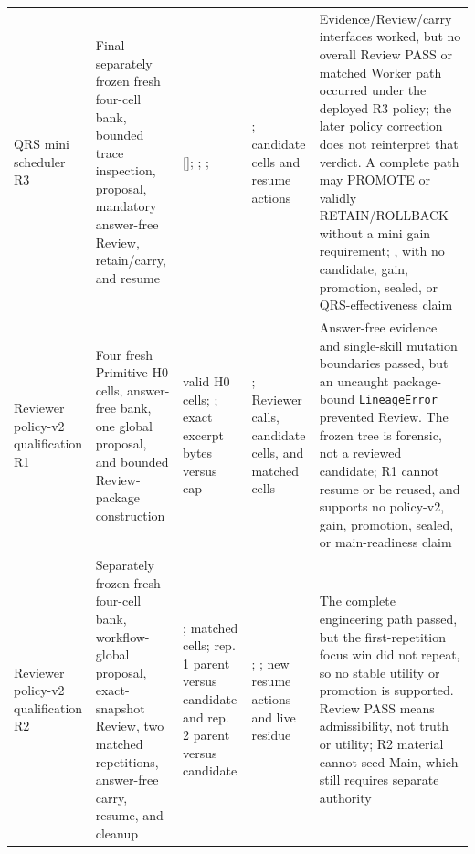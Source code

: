 \begin{table}[t]
\begin{tabular}{p{}p{}p{}p{}p{}}
QRS mini scheduler R3 & Final separately frozen fresh four-cell bank, bounded
trace inspection, proposal, mandatory answer-free Review, retain/carry, and
resume & [\MiniRThreeHZeroVector{}]; \MiniRThreeProposal{};
\MiniRThreeReview{}; \MiniRThreeClaimReview{} & \MiniRThreeStatus{};
\MiniRThreeCandidateCells{} candidate cells and \MiniRThreeResumeActions{}
resume actions & Evidence/Review/carry interfaces worked, but no overall
Review PASS or matched Worker path occurred under the deployed R3 policy; the
later policy correction does not reinterpret that verdict. A complete path may
PROMOTE or validly RETAIN/ROLLBACK without a mini gain requirement;
\MiniFinalMainDecision{}, with no candidate, gain, promotion, sealed, or
QRS-effectiveness claim \\

Reviewer policy-v2 qualification R1 & Four fresh Primitive-H0 cells,
answer-free bank, one global proposal, and bounded Review-package construction
& \ReviewerPolicyVTwoQualHZeroCells{} valid H0 cells;
\ReviewerPolicyVTwoQualProposal{}; exact excerpt
\ReviewerPolicyVTwoQualExcerptBytes{} bytes versus
\ReviewerPolicyVTwoQualExcerptCap{} cap &
\ReviewerPolicyVTwoQualStatus{}; \ReviewerPolicyVTwoQualReviewerCalls{}
Reviewer calls, \ReviewerPolicyVTwoQualCandidateCells{} candidate cells, and
\ReviewerPolicyVTwoQualMatchedCells{} matched cells & Answer-free evidence and
single-skill mutation boundaries passed, but an uncaught package-bound
\texttt{LineageError} prevented Review. The frozen tree is forensic, not a
reviewed candidate; R1 cannot resume or be reused, and supports no policy-v2,
gain, promotion, sealed, or main-readiness claim \\

Reviewer policy-v2 qualification R2 & Separately frozen fresh four-cell bank,
workflow-global proposal, exact-snapshot Review, two matched repetitions,
answer-free carry, resume, and cleanup &
\ReviewerPolicyVTwoQualRTwoReview{}; \ReviewerPolicyVTwoQualRTwoMatchedCells{}
matched cells; rep. 1 parent \ReviewerPolicyVTwoQualRTwoRepOneParent{} versus
candidate \ReviewerPolicyVTwoQualRTwoRepOneCandidate{} and rep. 2 parent
\ReviewerPolicyVTwoQualRTwoRepTwoParent{} versus candidate
\ReviewerPolicyVTwoQualRTwoRepTwoCandidate{} &
\ReviewerPolicyVTwoQualRTwoStatus{};
\ReviewerPolicyVTwoQualRTwoDecision{}; \ReviewerPolicyVTwoQualRTwoResumeActions{}
new resume actions and \ReviewerPolicyVTwoQualRTwoLiveResidue{} live residue &
The complete engineering path passed, but the first-repetition focus win did
not repeat, so no stable utility or promotion is supported. Review PASS means
admissibility, not truth or utility; R2 material cannot seed Main, which still
requires separate authority \\


\end{tabular}
\end{table}
